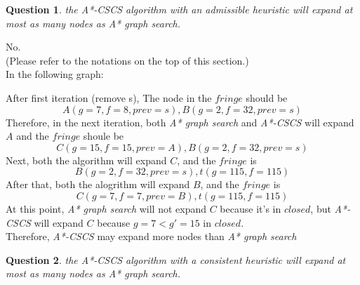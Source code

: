 \documentclass[10.5pt]{article}
\newtheorem{Q}{Question}
\begin{document}
\begin{Q}
	the A*-CSCS algorithm with an admissible heuristic will expand at most as many nodes as A* graph search.
\end{Q}
No. \\
(Please refer to the notations on the top of this section.)\\
In the following graph:
\begin{center}
\end{center}
After first iteration (remove s), The node in the \(fringe\) should be
$$
	A(g = 7, f = 8, prev = s), B(g = 2, f = 32, prev = s)
$$
Therefore, in the next iteration, both \textit{A* graph search} and \textit{A*-CSCS} will expand \(A\) and the \(fringe\) shoule be
$$
	C(g = 15, f = 15, prev = A), B(g = 2, f = 32, prev = s)
$$
Next, both the algorithm will expand \(C\), and the \(fringe\) is
$$
	B(g = 2, f = 32, prev = s), t(g = 115, f = 115)
$$
After that, both the alogrithm will expand \(B\), and the \(fringe\) is
$$
	C(g = 7, f = 7, prev = B), t(g = 115, f = 115)
$$
At this point, \textit{A* graph search} will not expand \(C\) because it's in \(closed\), but \textit{A*-CSCS} will expand \(C\) because \(g = 7 < g' = 15\) in \(closed\).\\
Therefore, \textit{A*-CSCS} may expand more nodes than \textit{A* graph search}
\pagebreak
\begin{Q}
	the A*-CSCS algorithm with a consistent heuristic will expand at most as many nodes as A* graph search.
\end{Q}
\end{document}

